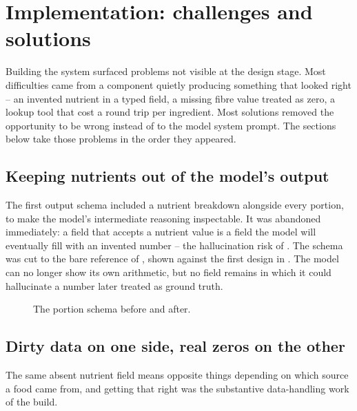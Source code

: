 \chapter{Implementation: challenges and solutions}
\label{cha:implementation}

Building the system surfaced problems not visible at the design stage. Most difficulties came from a component quietly producing something that looked right -- an invented nutrient in a typed field, a missing fibre value treated as zero, a lookup tool that cost a round trip per ingredient. Most solutions removed the opportunity to be wrong instead of to the model system prompt. The sections below take those problems in the order they appeared.

\section{Keeping nutrients out of the model's output}
\label{sec:impl-portion-ref}

The first output schema included a nutrient breakdown alongside every portion, to make the model's intermediate reasoning inspectable. It was abandoned immediately: a field that accepts a nutrient value is a field the model will eventually fill with an invented number -- the hallucination risk of . The schema was cut to the bare reference of , shown against the first design in . The model can no longer show its own arithmetic, but no field remains in which it could hallucinate a number later treated as ground truth.

\begin{figure}[htbp]
    \centering
    
    \caption{The portion schema before and after.}
    \label{fig:diagram-portion-schema}
\end{figure}

\section{Dirty data on one side, real zeros on the other}
\label{sec:impl-missing-nutrients}

The same absent nutrient field means opposite things depending on which source a food came from, and getting that right was the substantive data-handling work of the build.

